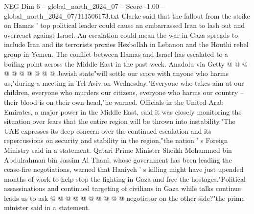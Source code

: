 \begin{textsample}{NEG Dim 6 – global\_north\_2024\_07 – Score -1.00 – global\_north\_2024\_07/111506173.txt}
Clarke said that the fallout from the strike on Hamas ' top political leader could cause an embarrassed Iran to lash out and overreact against Israel.
An escalation could mean the war in Gaza spreads to include Iran and its terrorists proxies Hezbollah in Lebanon and the Houthi rebel group in Yemen.
The conflict between Hamas and Israel has escalated to a boiling point across the Middle East in the past week.
Anadolu via Getty @ @ @ @ @ @ @ @ @ @ Jewish state"will settle our score with anyone who harms us,"during a meeting in Tel Aviv on Wednesday."Everyone who takes aim at our children, everyone who murders our citizens, everyone who harms our country -- their blood is on their own head,"he warned.
Officials in the United Arab Emirates, a major power in the Middle East, said it was closely monitoring the situation over fears that the entire region will be thrown into instability."The UAE expresses its deep concern over the continued escalation and its repercussions on security and stability in the region,"the nation ' s Foreign Ministry said in a statement.
Qatari Prime Minister Sheikh Mohammed bin Abdulrahman bin Jassim Al Thani, whose government has been leading the cease-fire negotiations, warned that Haniyeh ' s killing might have just upended months of work to help stop the fighting in Gaza and free the hostages."Political assassinations and continued targeting of civilians in Gaza while talks continue leads us to ask @ @ @ @ @ @ @ @ @ @ negotiator on the other side?"the prime minister said in a statement.

\end{textsample}
